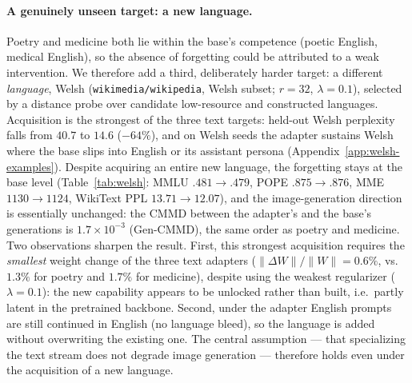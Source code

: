 \documentclass{article}
\begin{document}
\paragraph{A genuinely unseen target: a new language.}
Poetry and medicine both lie within the base's competence (poetic English,
medical English), so the absence of forgetting could be attributed to a weak
intervention. We therefore add a third, deliberately harder target: a different
\emph{language}, Welsh (\texttt{wikimedia/wikipedia}, Welsh subset; $r{=}32$,
$\lambda{=}0.1$), selected by a distance probe over candidate low-resource and
constructed languages. Acquisition is the strongest of the three text targets:
held-out Welsh perplexity falls from $40.7$ to $14.6$ ($-64\%$), and on Welsh
seeds the adapter sustains Welsh where the base slips into English or its
assistant persona (Appendix~\ref{app:welsh-examples}). Despite acquiring an entire
new language, the forgetting stays at the base level (Table~\ref{tab:welsh}: MMLU
$.481\!\to\!.479$, POPE $.875\!\to\!.876$, MME $1130\!\to\!1124$, WikiText PPL
$13.71\!\to\!12.07$), and the image-generation direction is essentially unchanged:
the CMMD between the adapter's and the base's generations is $1.7\times10^{-3}$
(Gen-CMMD), the same order as poetry and medicine. Two observations sharpen the
result. First, this strongest acquisition requires the \emph{smallest} weight
change of the three text adapters ($\lVert\Delta W\rVert/\lVert W\rVert = 0.6\%$,
vs.\ $1.3\%$ for poetry and $1.7\%$ for medicine), despite using the weakest
regularizer ($\lambda{=}0.1$): the new capability appears to be unlocked rather
than built, i.e.\ partly latent in the pretrained backbone. Second, under the
adapter English prompts are still continued in English (no language bleed), so the
language is added without overwriting the existing one. The central assumption ---
that specializing the text stream does not degrade image generation --- therefore
holds even under the acquisition of a new language.
\end{document}
